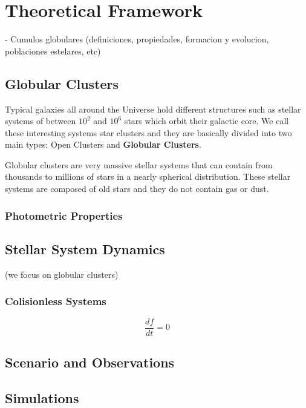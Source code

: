 \chapter{Theoretical Framework}

- Cumulos globulares (definiciones, propiedades, formacion y evolucion, poblaciones estelares, etc)

\section{Globular Clusters}

Typical galaxies all around the Universe hold different structures such as stellar systems of between $ 10^{2} $ and $ 10^{6} $ stars which orbit their galactic core. We call these interesting systems star clusters and they are basically divided into two main types: Open Clusters and \textbf{Globular Clusters}.

Globular clusters are very massive stellar systems that can contain from thousands to millions of stars in a nearly spherical distribution. These stellar systems are composed of old stars and they do not contain gas or dust. 

\subsection{Photometric Properties}

\section{Stellar System Dynamics}

(we focus on globular clusters)

\subsection{Colisionless Systems}

\begin{equation}
\dfrac{df}{dt}=0
\end{equation}


\section{Scenario and Observations}

\section{Simulations}
